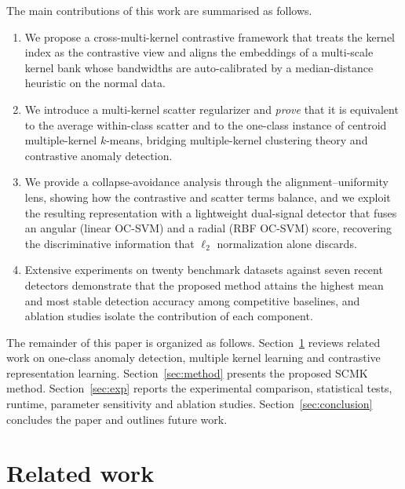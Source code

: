 \documentclass[times, review, 10pt]{elsarticle}
\begin{document}
The main contributions of this work are summarised as follows.
\begin{enumerate}[\indent(1)]
\item We propose a cross-multi-kernel contrastive framework that treats the
kernel index as the contrastive view and aligns the embeddings of a multi-scale
kernel bank whose bandwidths are auto-calibrated by a median-distance heuristic
on the normal data.
\item We introduce a multi-kernel scatter regularizer and \emph{prove} that it is
equivalent to the average within-class scatter and to the one-class instance of
centroid multiple-kernel $k$-means, bridging multiple-kernel clustering theory
and contrastive anomaly detection.
\item We provide a collapse-avoidance analysis through the
alignment--uniformity lens, showing how the contrastive and scatter terms
balance, and we exploit the resulting representation with a lightweight
dual-signal detector that fuses an angular (linear OC-SVM) and a radial (RBF
OC-SVM) score, recovering the discriminative information that $\ell_2$
normalization alone discards.
\item Extensive experiments on twenty benchmark datasets against seven recent
detectors demonstrate that the proposed method attains the highest mean and most
stable detection accuracy among competitive baselines, and ablation studies isolate the
contribution of each component.
\end{enumerate}

The remainder of this paper is organized as follows.
Section~\ref{sec:related} reviews related work on one-class anomaly detection,
multiple kernel learning and contrastive representation learning.
Section~\ref{sec:method} presents the proposed SCMK method.
Section~\ref{sec:exp} reports the experimental comparison, statistical tests,
runtime, parameter sensitivity and ablation studies.
Section~\ref{sec:conclusion} concludes the paper and outlines future work.

\section{Related work}
\label{sec:related}
\end{document}
